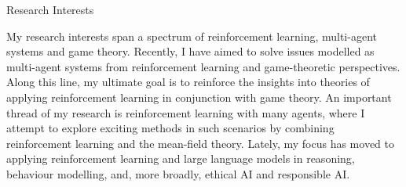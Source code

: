 \documentclass{resume} %
\begin{document}
\begin{rSection}{Research Interests}

My research interests span a spectrum of reinforcement learning, multi-agent systems and game theory. %
Recently, I have aimed to solve issues modelled as multi-agent systems from reinforcement learning and game-theoretic perspectives. Along this line, my ultimate goal is to reinforce the insights into theories of applying reinforcement learning in conjunction with game theory. An important thread of my research is reinforcement learning with many agents, where I attempt to explore exciting methods in such scenarios by combining reinforcement learning and the mean-field theory. Lately, my focus has moved to applying reinforcement learning and large language models in reasoning, behaviour modelling, and, more broadly, ethical AI and responsible AI.

\end{rSection}
\end{document}
